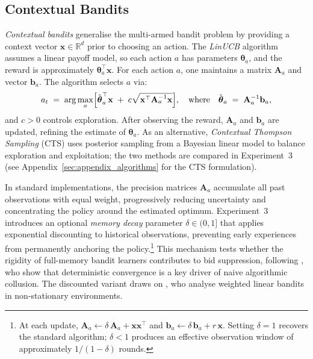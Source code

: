 \subsection{Contextual Bandits}

\emph{Contextual bandits} generalise the multi-armed bandit problem by providing a context vector $\mathbf{x}\in\mathbb{R}^d$ prior to choosing an action. The \emph{LinUCB} algorithm assumes a linear payoff model, so each action $a$ has parameters $\boldsymbol{\theta}_a$, and the reward is approximately $\boldsymbol{\theta}_a^\top \mathbf{x}$. For each action $a$, one maintains a matrix $\mathbf{A}_a$ and vector $\mathbf{b}_a$. The algorithm selects $a$ via:
\begin{equation}
a_t
\;=\;
\arg\max_{a}\Bigl[\hat{\boldsymbol{\theta}}_{a}^\top \mathbf{x}
\;+\;
c\sqrt{\mathbf{x}^\top \mathbf{A}_a^{-1}\mathbf{x}}\Bigr],
\quad
\text{where}
\quad
\hat{\boldsymbol{\theta}}_{a} \;=\; \mathbf{A}_a^{-1}\mathbf{b}_a,
\end{equation}
and $c>0$ controls exploration. After observing the reward, $\mathbf{A}_a$ and $\mathbf{b}_a$ are updated, refining the estimate of $\boldsymbol{\theta}_a$. As an alternative, \emph{Contextual Thompson Sampling} (CTS) uses posterior sampling from a Bayesian linear model to balance exploration and exploitation; the two methods are compared in Experiment~3 (see Appendix~\ref{sec:appendix_algorithms} for the CTS formulation).

In standard implementations, the precision matrices $\mathbf{A}_a$ accumulate all past observations with equal weight, progressively reducing uncertainty and concentrating the policy around the estimated optimum. Experiment~3 introduces an optional \emph{memory decay} parameter $\delta \in (0,1]$ that applies exponential discounting to historical observations, preventing early experiences from permanently anchoring the policy.\footnote{At each update, $\mathbf{A}_a \leftarrow \delta\,\mathbf{A}_a + \mathbf{x}\mathbf{x}^\top$ and $\mathbf{b}_a \leftarrow \delta\,\mathbf{b}_a + r\,\mathbf{x}$. Setting $\delta = 1$ recovers the standard algorithm; $\delta < 1$ produces an effective observation window of approximately $1/(1-\delta)$ rounds.} This mechanism tests whether the rigidity of full-memory bandit learners contributes to bid suppression, following \citet{Douglas2024}, who show that deterministic convergence is a key driver of naive algorithmic collusion. The discounted variant draws on \citet{Russac2019}, who analyse weighted linear bandits in non-stationary environments.

